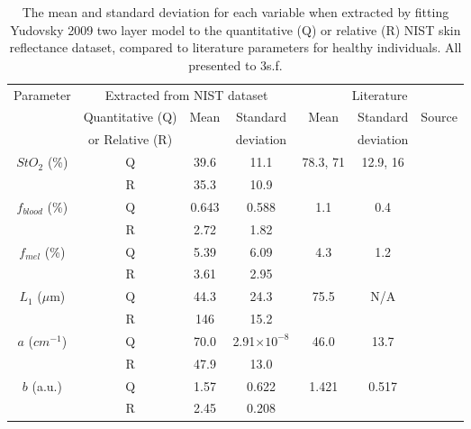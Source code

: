 \begin{table}[h]
    \centering
    \caption{The mean and standard deviation for each variable when extracted by fitting Yudovsky 2009 two layer model to the quantitative (Q) or relative (R) NIST skin reflectance dataset, compared to literature parameters for healthy individuals. All presented to 3s.f.}
    \begin{tabular}{|c|ccc|ccc|}
        \hline
        \multirow{2}{*}{Parameter} & \multicolumn{3}{c}{Extracted from NIST dataset} & \multicolumn{3}{|c|}{Literature} \\
        \cline{2-7}
         & Quantitative (Q) & \multirow{2}{*}{Mean} & Standard & \multirow{2}{*}{Mean} & Standard & \multirow{2}{*}{Source} \\
         & or Relative (R) &  & deviation &  & deviation &  \\
        \hline
        \multirow{2}{*}{$StO_2$ (\%)} & Q & 39.6 & 11.1 & \multirow{2}{*}{78.3, 71} & \multirow{2}{*}{12.9, 16} & \cite{VanManen2021} \\ %
        & R & 35.3 & 10.9 & & & \cite{Nishidate2011} \\ %
        \hline
        $f_{blood}$ (\%) & Q & 0.643 & 0.588 & \multirow{2}{*}{1.1} & \multirow{2}{*}{0.4} & \multirow{2}{*}{\cite{Nishidate2011}} \\ %
        & R & 2.72 & 1.82 & & & \\
        \hline
        $f_{mel}$ (\%) & Q & 5.39 & 6.09 & \multirow{2}{*}{4.3} & \multirow{2}{*}{1.2} & \multirow{2}{*}{\cite{Nishidate2011}} \\ %
        & R & 3.61 & 2.95 & & &  \\
        \hline
        $L_1$ ($\mu$m) & Q & 44.3 & 24.3 & \multirow{2}{*}{75.5} & \multirow{2}{*}{N/A} & \multirow{2}{*}{\cite{Lintzeri2022}} \\ %
        & R & 146 & 15.2 & & &  \\
        \hline
        $a$ (\textrm{$cm^{-1}$}) & Q & 70.0 & 2.91$\times 10^{-8}$ & \multirow{2}{*}{46.0} & \multirow{2}{*}{13.7} & \multirow{2}{*}{\cite{Jacques2013}} \\ %
        & R & 47.9 & 13.0 & & &  \\
        \hline
        $b$ (a.u.) & Q & 1.57 & 0.622 & \multirow{2}{*}{1.421} & \multirow{2}{*}{0.517} & \multirow{2}{*}{\cite{Jacques2013}} \\ %
        & R & 2.45 & 0.208 & & &  \\
        \hline
    \end{tabular}
    \label{tb:NISTparams}
\end{table}
